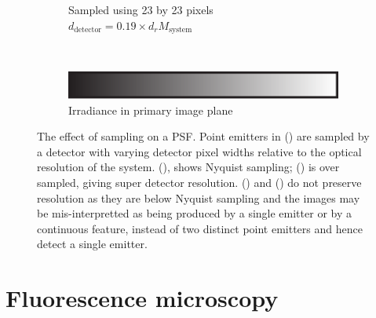 \begin{figure}
\begin{subfigure}[t]{0.4\textwidth}
        \caption{Sampled using 23 by 23 pixels\\
        \(d_{\text{detector}} = 0.19 \times d_{r}M_{\text{system}}\)}\label{fig:digital_airy_sample_23}
    \end{subfigure}\\
    \begin{subfigure}[t]{\textwidth}
      \vspace{\abovecaptionskip}
      \centering
      \includegraphics{./sampling/colourbar}\\
      Irradiance in primary image plane
    \end{subfigure}
    \caption[The effect of sampling on a \gls{PSF}]{The effect of sampling on a \gls{PSF}.
    Point emitters in () are sampled by a detector with varying detector pixel widths relative to the optical resolution of the system.
    (), shows Nyquist sampling;
    () is over sampled, giving super detector resolution.
    () and () do not preserve resolution as they are below Nyquist sampling and the images may be mis-interpretted as being produced by a single emitter or by a continuous feature, instead of two distinct point emitters and hence detect a single emitter.}\label{fig:digital_airy}
\end{figure}
\pagebreak

%


\section{Fluorescence microscopy}
